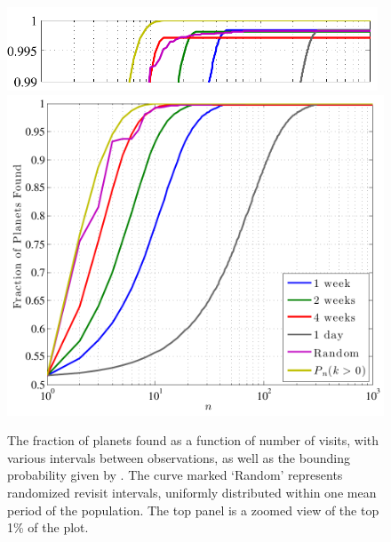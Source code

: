 \begin{figure}[ht]
 \begin{center}
 \includegraphics[width=4.34in,clip=true,trim=0in 0in 0.05in 0in]{./figures/compSimZoom}\\
   \includegraphics[width=4.5in]{./figures/compSim}
 \end{center}
 \caption[Planet detection probability over multiple visits]{ \label{fig:compSim} 
	The fraction of planets found as a function of number of visits, with various intervals between observations, as well as the bounding probability given by .  The curve marked `Random' represents randomized revisit intervals, uniformly distributed within one mean period of the population.  The top panel is a zoomed view of the top 1\% of the plot.}
\end{figure} 

